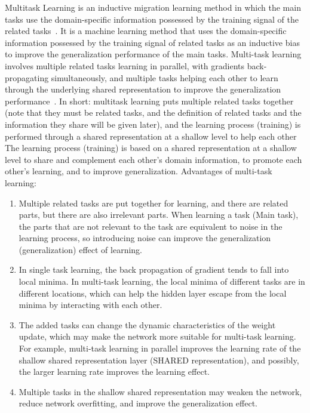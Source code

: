 Multitask Learning is an inductive migration learning method in which the main tasks use the domain-specific information possessed by the training signal of the related tasks~\cite{bengio2006greedy}. It is a machine learning method that uses the domain-specific information possessed by the training signal of related tasks as an inductive bias to improve the generalization performance of the main tasks. Multi-task learning involves multiple related tasks learning in parallel, with gradients back-propagating simultaneously, and multiple tasks helping each other to learn through the underlying shared representation to improve the generalization performance~\cite{collobert2008unified}. In short: multitask learning puts multiple related tasks together (note that they must be related tasks, and the definition of related tasks and the information they share will be given later), and the learning process (training) is performed through a shared representation at a shallow level to help each other The learning process (training) is based on a shared representation at a shallow level to share and complement each other's domain information, to promote each other's learning, and to improve generalization.
Advantages of multi-task learning:
\begin{enumerate}[\qquad  1.]
	\item Multiple related tasks are put together for learning, and there are related parts, but there are also irrelevant parts. When learning a task (Main task), the parts that are not relevant to the task are equivalent to noise in the learning process, so introducing noise can improve the generalization (generalization) effect of learning.
	\item In single task learning, the back propagation of gradient tends to fall into local minima. In multi-task learning, the local minima of different tasks are in different locations, which can help the hidden layer escape from the local minima by interacting with each other.
	\item The added tasks can change the dynamic characteristics of the weight update, which may make the network more suitable for multi-task learning. For example, multi-task learning in parallel improves the learning rate of the shallow shared representation layer (SHARED representation), and possibly, the larger learning rate improves the learning effect.
	\item Multiple tasks in the shallow shared representation may weaken the network, reduce network overfitting, and improve the generalization effect.
\end{enumerate}

